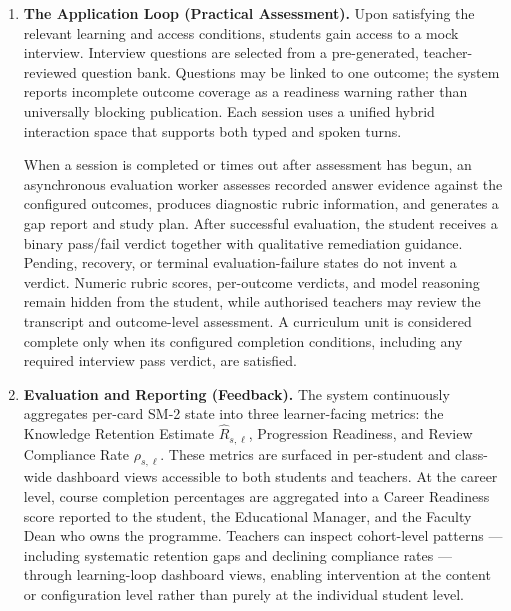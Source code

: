 \begin{enumerate}
    \item \textbf{The Application Loop (Practical Assessment).}
    Upon satisfying the relevant learning and access conditions, students gain
    access to a mock interview. Interview questions are selected from a
    pre-generated, teacher-reviewed question bank. Questions may be linked
    to one outcome; the system reports incomplete outcome coverage as a
    readiness warning rather than universally blocking publication. Each
    session uses a unified hybrid interaction space that supports both typed
    and spoken turns.

    When a session is completed or times out after assessment has begun, an
    asynchronous evaluation worker assesses recorded answer evidence against
    the configured outcomes, produces diagnostic rubric information, and
    generates a gap report and study plan. After successful evaluation, the
    student receives a binary pass/fail verdict together with qualitative
    remediation guidance. Pending, recovery, or terminal evaluation-failure
    states do not invent a verdict. Numeric rubric scores, per-outcome
    verdicts, and model reasoning remain hidden from the student, while
    authorised teachers may review the transcript and outcome-level
    assessment. A curriculum unit is considered complete only when its
    configured completion conditions, including any required interview pass
    verdict, are satisfied.

    \item \textbf{Evaluation and Reporting (Feedback).}
    The system continuously aggregates per-card SM-2 state into three 
    learner-facing metrics: the Knowledge Retention Estimate 
    $\hat{R}_{s,\ell}$, Progression Readiness, and Review Compliance 
    Rate $\rho_{s,\ell}$. These metrics are surfaced in per-student 
    and class-wide dashboard views accessible to both students and 
    teachers. At the career level, course completion percentages are 
    aggregated into a Career Readiness score reported to the student,
    the Educational Manager, and the Faculty Dean who owns the
    programme. Teachers can inspect cohort-level patterns — including
    systematic retention gaps and declining compliance rates — through
    learning-loop dashboard views, enabling intervention at the content
    or configuration level rather than purely at the individual student
    level.


\end{enumerate}
